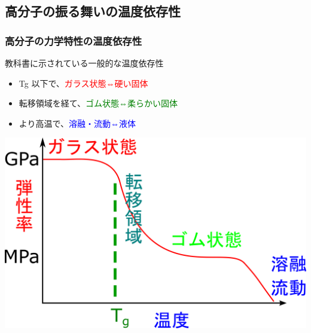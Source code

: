\documentclass[12pt, dvipdfmx]{beamer}
\begin{document}
\subsection{高分子の振る舞いの温度依存性}
\begin{frame}
	\frametitle{高分子の力学特性の温度依存性}
			\begin{block}{教科書に示されている一般的な温度依存性}
				\begin{itemize}
					\item Tg 以下で、\textcolor{red}{ガラス状態⇔硬い固体}
					\item 転移領域を経て、\textcolor{green}{ゴム状態⇔柔らかい固体}
					\item より高温で、\textcolor{blue}{溶融・流動⇔液体}
				\end{itemize}
			\end{block}
				\vspace{3mm}
				\begin{center}
					\includegraphics[width=.6\textwidth]{polymer_spectrum.png}
				\end{center}
\end{frame}
\end{document}
